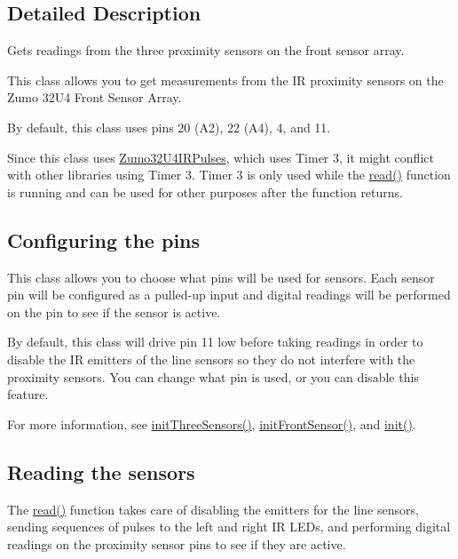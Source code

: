 \subsection{Detailed Description}
Gets readings from the three proximity sensors on the front sensor array. 

This class allows you to get measurements from the IR proximity sensors on the Zumo 32\+U4 Front Sensor Array.

By default, this class uses pins 20 (A2), 22 (A4), 4, and 11.

Since this class uses \hyperlink{class_zumo32_u4_i_r_pulses}{Zumo32\+U4\+I\+R\+Pulses}, which uses Timer 3, it might conflict with other libraries using Timer 3. Timer 3 is only used while the \hyperlink{class_zumo32_u4_proximity_sensors_a071d935e10e2a16a3ae2559d16a12683}{read()} function is running and can be used for other purposes after the function returns.\hypertarget{class_zumo32_u4_proximity_sensors_autotoc_md12}{}\subsection{Configuring the pins}\label{class_zumo32_u4_proximity_sensors_autotoc_md12}
This class allows you to choose what pins will be used for sensors. Each sensor pin will be configured as a pulled-\/up input and digital readings will be performed on the pin to see if the sensor is active.

By default, this class will drive pin 11 low before taking readings in order to disable the IR emitters of the line sensors so they do not interfere with the proximity sensors. You can change what pin is used, or you can disable this feature.

For more information, see \hyperlink{class_zumo32_u4_proximity_sensors_a521c7fe0992317c0566ff59ec132b469}{init\+Three\+Sensors()}, \hyperlink{class_zumo32_u4_proximity_sensors_abcc9c393f47cf994f06d9cae51369a6a}{init\+Front\+Sensor()}, and \hyperlink{class_zumo32_u4_proximity_sensors_a250ef26e66807bc800adc42be912fab5}{init()}.\hypertarget{class_zumo32_u4_proximity_sensors_autotoc_md13}{}\subsection{Reading the sensors}\label{class_zumo32_u4_proximity_sensors_autotoc_md13}
The \hyperlink{class_zumo32_u4_proximity_sensors_a071d935e10e2a16a3ae2559d16a12683}{read()} function takes care of disabling the emitters for the line sensors, sending sequences of pulses to the left and right IR L\+E\+Ds, and performing digital readings on the proximity sensor pins to see if they are active.

